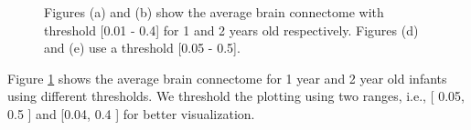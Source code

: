 \documentclass[]{spie}  %
\begin{document}
\begin{figure}
\caption[Average brain connectome at 1 (a) and 2 (b) year old using the circle plotting ]{Figures (a) and (b) show the average brain connectome with threshold 
[0.01 - 0.4] for 1 and 2 years old respectively. Figures (d) and (e) use a threshold [0.05 - 0.5]. }
\label{fig:AverageBrainConnectome}
\end{figure} 

Figure \ref{fig:AverageBrainConnectome} shows the average brain connectome for 1 year and 2 year old infants using different thresholds. We threshold the plotting using two ranges, i.e., [ 0.05, 0.5 ] and [0.04, 0.4 ] for better visualization.
\end{document}
